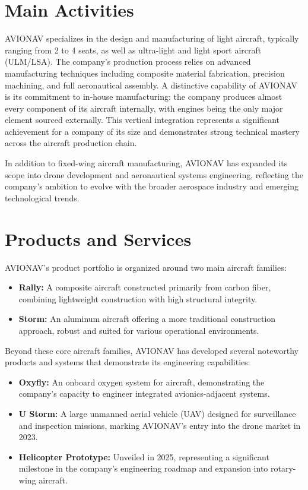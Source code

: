 \section{Main Activities}

AVIONAV specializes in the design and manufacturing of light aircraft, typically ranging from 2 to 4 seats, as well as ultra-light and light sport aircraft (ULM/LSA). The company's production process relies on advanced manufacturing techniques including composite material fabrication, precision machining, and full aeronautical assembly. A distinctive capability of AVIONAV is its commitment to in-house manufacturing: the company produces almost every component of its aircraft internally, with engines being the only major element sourced externally. This vertical integration represents a significant achievement for a company of its size and demonstrates strong technical mastery across the aircraft production chain.

In addition to fixed-wing aircraft manufacturing, AVIONAV has expanded its scope into drone development and aeronautical systems engineering, reflecting the company's ambition to evolve with the broader aerospace industry and emerging technological trends.

\section{Products and Services}

AVIONAV's product portfolio is organized around two main aircraft families:

\begin{itemize}
    \item \textbf{Rally:} A composite aircraft constructed primarily from carbon fiber, combining lightweight construction with high structural integrity.
    \item \textbf{Storm:} An aluminum aircraft offering a more traditional construction approach, robust and suited for various operational environments.
\end{itemize}

Beyond these core aircraft families, AVIONAV has developed several noteworthy products and systems that demonstrate its engineering capabilities:

\begin{itemize}
    \item \textbf{Oxyfly:} An onboard oxygen system for aircraft, demonstrating the company's capacity to engineer integrated avionics-adjacent systems.
    \item \textbf{U Storm:} A large unmanned aerial vehicle (UAV) designed for surveillance and inspection missions, marking AVIONAV's entry into the drone market in 2023.
    \item \textbf{Helicopter Prototype:} Unveiled in 2025, representing a significant milestone in the company's engineering roadmap and expansion into rotary-wing aircraft.
\end{itemize}

